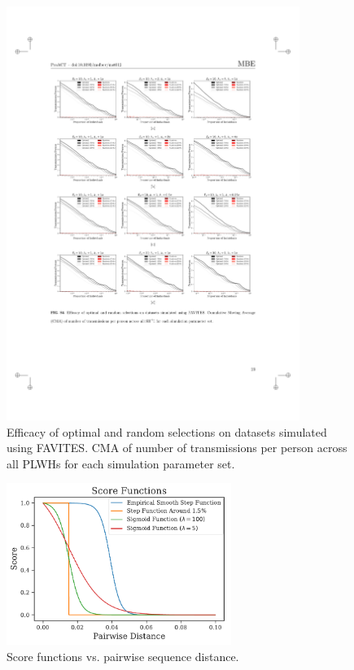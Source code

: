 \begin{figure} %
\centering
\includegraphics[width=0.85\textwidth]{figs/proact-efficacy-wide}
\caption[Optimal and Expected Raw Performance on Simulated Datasets]
{Efficacy of optimal and random selections on datasets simulated using FAVITES. \gls{CMA} of number of transmissions per person across all \glspl{PLWH} for each simulation parameter set.}
\label{fig:proact-efficacy-wide}
\end{figure}

\begin{figure} %
\centering
\includegraphics[width=0.65\textwidth]{figs/proact-scorefuncs}
\caption[Genetic Linkage Score Functions]
{Score functions vs. pairwise sequence distance.}
\label{fig:proact-scorefuncs}
\end{figure}

